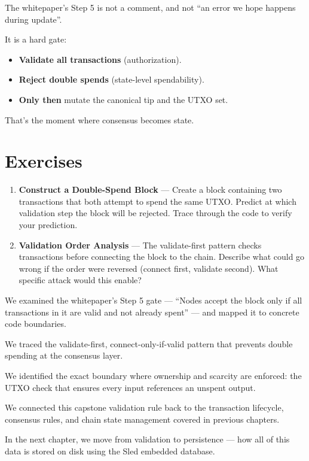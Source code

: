 The whitepaper's Step 5 is not a comment, and not ``an error we hope happens during update''.

It is a hard gate:

\begin{itemize}
  \item \textbf{Validate all transactions} (authorization).
  \item \textbf{Reject double spends} (state-level spendability).
  \item \textbf{Only then} mutate the canonical tip and the UTXO set.
\end{itemize}

That's the moment where consensus becomes state.

\section{Exercises}
\label{sec:ch10-exercises}

\begin{enumerate}
  \item \textbf{Construct a Double-Spend Block} --- Create a block containing two transactions that both attempt to spend the same UTXO. Predict at which validation step the block will be rejected. Trace through the code to verify your prediction.

  \item \textbf{Validation Order Analysis} --- The validate-first pattern checks transactions before connecting the block to the chain. Describe what could go wrong if the order were reversed (connect first, validate second). What specific attack would this enable?
\end{enumerate}

\begin{chaptersummary}
\item We examined the whitepaper's Step 5 gate --- ``Nodes accept the block only if all transactions in it are valid and not already spent'' --- and mapped it to concrete code boundaries.
\item We traced the validate-first, connect-only-if-valid pattern that prevents double spending at the consensus layer.
\item We identified the exact boundary where ownership and scarcity are enforced: the UTXO check that ensures every input references an unspent output.
\item We connected this capstone validation rule back to the transaction lifecycle, consensus rules, and chain state management covered in previous chapters.
\end{chaptersummary}

In the next chapter, we move from validation to persistence --- how all of this data is stored on disk using the Sled embedded database.
